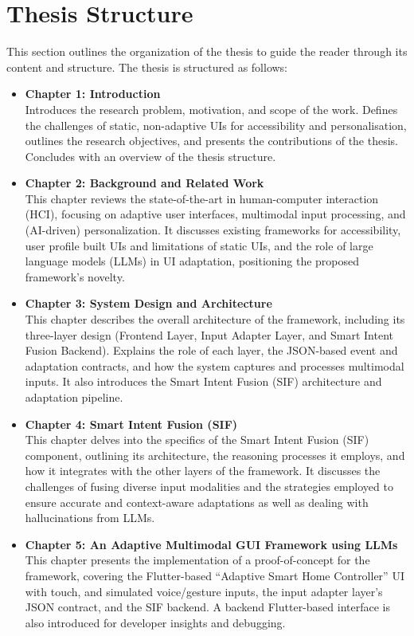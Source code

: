 \documentclass[openany]{book}
\begin{document}
\section{Thesis Structure}
This section outlines the organization of the thesis to guide the reader through its content and structure.
The thesis is structured as follows:
\begin{itemize}
     \item \textbf{Chapter 1: Introduction} \\
    Introduces the research problem, motivation, and scope of the work. Defines the challenges of static, non-adaptive UIs for accessibility and personalisation, outlines the research objectives, and presents the contributions of the thesis. Concludes with an overview of the thesis structure.
    \item \textbf{Chapter 2: Background and Related Work} \\
    This chapter reviews the state-of-the-art in human-computer interaction (HCI), focusing on adaptive user interfaces, multimodal input processing, and (AI-driven) personalization. It discusses existing frameworks for accessibility, user profile built UIs and limitations of static UIs, and the role of large language models (LLMs) in UI adaptation, positioning the proposed framework’s novelty.
    \item \textbf{Chapter 3: System Design and Architecture} \\
    This chapter describes the overall architecture of the framework, including its three-layer design (Frontend Layer, Input Adapter Layer, and Smart Intent Fusion Backend). Explains the role of each layer, the JSON-based event and adaptation contracts, and how the system captures and processes multimodal inputs. It also introduces the Smart Intent Fusion (SIF) architecture and adaptation pipeline.
    \item \textbf{Chapter 4: Smart Intent Fusion (SIF)} \\
    This chapter delves into the specifics of the Smart Intent Fusion (SIF) component, outlining its architecture, the reasoning processes it employs, and how it integrates with the other layers of the framework. It discusses the challenges of fusing diverse input modalities and the strategies employed to ensure accurate and context-aware adaptations as well as dealing with hallucinations from LLMs.
    \item \textbf{Chapter 5: An Adaptive Multimodal GUI Framework using LLMs} \\
    This chapter presents the implementation of a proof-of-concept for the framework, covering the Flutter-based “Adaptive Smart Home Controller” UI with touch, and simulated voice/gesture inputs, the input adapter layer’s JSON contract, and the SIF backend. A backend Flutter-based interface is also introduced for developer insights and debugging.

\end{itemize}
\end{document}
